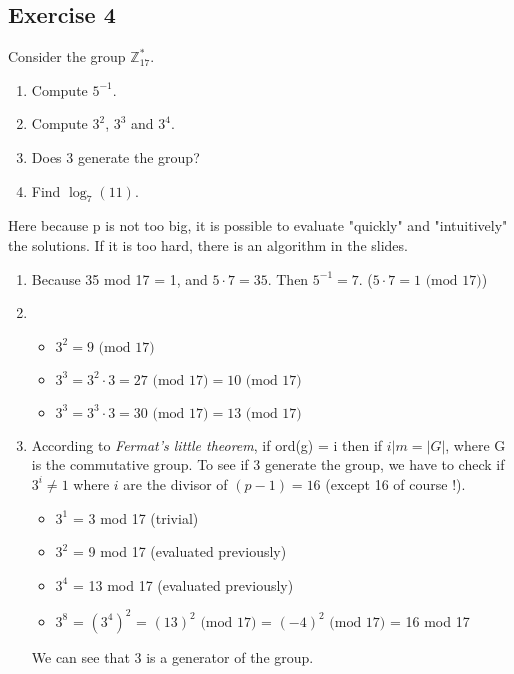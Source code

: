 \subsection{Exercise 4}
Consider the group $\mathbb{Z}^{\ast}_{17}$.
\begin{enumerate}
\item Compute $5^{-1}$.
\item Compute $3^2$, $3^3$ and $3^4$.
\item Does $3$ generate the group?
\item Find $\log_{7}(11)$.
\end{enumerate}
\begin{solution}
Here because p is not too big, it is possible to evaluate "quickly" and "intuitively" the solutions. If it is too hard, there is an algorithm in the slides. 
\begin{enumerate}
    \item Because 35 mod 17 = 1, and $5 \cdot 7 = 35$. \newline Then $5^{-1} = 7$.  ($5 \cdot 7 = 1 \text{ (mod 17)}$)
    \item \begin{itemize}
        \item $3^2 = 9 \text{ (mod 17)}$
        \item $3^3 = 3^2 \cdot 3 = 27 \text{ (mod 17)} = 10 \text{ (mod 17)}$
        \item $3^3 = 3^3 \cdot 3 = 30 \text{ (mod 17)} = 13 \text{ (mod 17)}$
    \end{itemize}
    \item According to \textit{Fermat's little theorem}, if ord(g) = i then if $i|m = |G|$, where G is the commutative group. To see if 3 generate the group, we have to check if $3^i \neq 1$ where $i$ are the divisor of $(p-1) = 16$ (except 16 of course !).
    \begin{itemize}
        \item $3^1$ = 3 mod 17 (trivial)
        \item $3^2$ = 9 mod 17 (evaluated previously)
        \item $3^4$ = 13 mod 17 (evaluated previously)
        \item $3^8$ = $(3^4)^2$ = $(13)^2 \text{ (mod 17)}$ = $(-4)^2 \text{ (mod 17)}$ = 16 mod 17
    \end{itemize}
    We can see that 3 is a generator of the group. 
    

\end{enumerate}
\end{solution}
